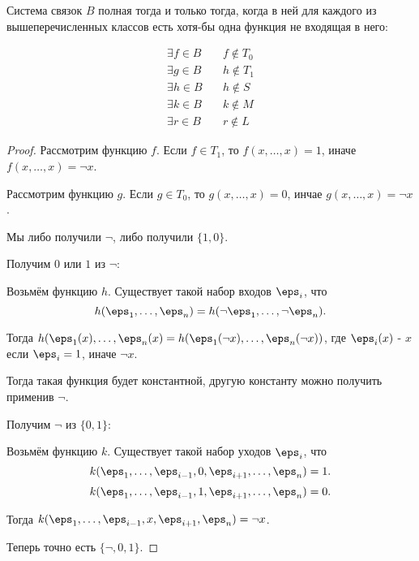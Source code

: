 \begin{theorem} \thmslashn

    Система связок $B$ полная тогда и только тогда, когда в ней для каждого из вышеперечисленных классов есть хотя-бы одна функция не входящая в него:
    
    \begin{equation*}
        \begin{split}
            \exists{f\in B}\quad& f \not\in T_0\\
            \exists{g\in B}\quad& h \not\in T_1\\
            \exists{h\in B}\quad& h \not\in S\\
            \exists{k\in B}\quad& k \not\in M\\
            \exists{r\in B}\quad& r \not\in L
        \end{split}
    \end{equation*}
    \begin{proof} \thmslashn
    
        Рассмотрим функцию $f$. Если $f\in T_1$, то $f(x, \ldots, x) = 1$, иначе $f(x, \ldots, x) = \neg x$.

        Рассмотрим функцию $g$. Если $g\in T_0$, то $g(x, \ldots, x) = 0$, инчае $g(x, \ldots, x) = \neg x$.

        Мы либо получили $\neg$, либо получили $\{1, 0\}$.

        Получим $0$ или $1$ из $\neg$:

        Возьмём функцию $h$. Существует такой набор входов $\eps_{i}$, что
        \[ h(\eps_1, \ldots, \eps_{n}) = h(\neg \eps_1, \ldots, \neg \eps_{n}) .\]

        Тогда $h(\eps_1(x), \ldots, \eps_{n}(x) = h(\eps_1(\neg x), \ldots, \eps_{n}(\neg x))$, где $\eps_{i}(x)$ - $x$ если $\eps_{i} = 1$, иначе $\neg x$.

        Тогда такая функция будет константной, другую константу можно получить применив $\neg$.

        Получим $\neg$ из $\{0, 1\} $:

        Возьмём функцию $k$. Существует такой набор уходов $\eps_{i}$, что
        \[ k(\eps_1, \ldots, \eps_{i-1}, 0, \eps_{i+1}, \ldots, \eps_{n}) = 1 .\] 
        \[ k(\eps_1, \ldots, \eps_{i-1}, 1, \eps_{i+1}, \ldots, \eps_{n}) = 0 .\]

        Тогда $k(\eps_1, \ldots, \eps_{i-1}, x, \eps_{i+1}, \eps_{n}) = \neg x$.

        Теперь точно есть $\{\neg, 0, 1\} $.


\end{proof}
\end{theorem}
